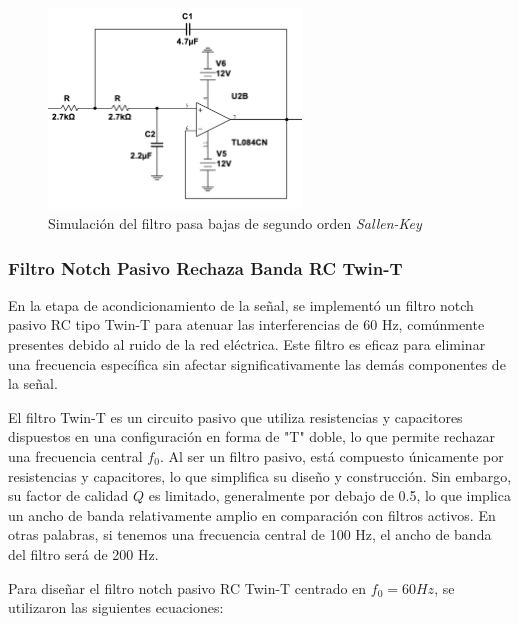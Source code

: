         \begin{figure}[H]
            \centering
            \includegraphics[width=0.6\textwidth]{img/Desarrollo/multisim_pasaBajos.png}
            \caption[Simulación del filtro pasa bajas de segundo orden \textit{Sallen-Key}.]{Simulación del filtro pasa bajas de segundo orden \textit{Sallen-Key}\footnotemark}
            \label{fig:Simulacion_Filtro_Pasa_Bajas}
        \end{figure}
            
        \subsubsection{Filtro Notch Pasivo Rechaza Banda RC Twin-T}
        En la etapa de acondicionamiento de la señal, se implementó un filtro notch pasivo RC tipo Twin-T para atenuar las interferencias de 60 Hz, comúnmente presentes debido al ruido de la red eléctrica. Este filtro es eficaz para eliminar una frecuencia específica sin afectar significativamente las demás componentes de la señal.

        El filtro Twin-T es un circuito pasivo que utiliza resistencias y capacitores dispuestos en una configuración en forma de "T" doble, lo que permite rechazar una frecuencia central $f_0$. Al ser un filtro pasivo, está compuesto únicamente por resistencias y capacitores, lo que simplifica su diseño y construcción. Sin embargo, su factor de calidad $Q$ es limitado, generalmente por debajo de 0.5, lo que implica un ancho de banda relativamente amplio en comparación con filtros activos. En otras palabras, si tenemos una frecuencia central de 100 Hz, el ancho de banda del filtro será de 200 Hz.

        Para diseñar el filtro notch pasivo RC Twin-T centrado en $f_0 = 60 Hz$, se utilizaron las siguientes ecuaciones:


